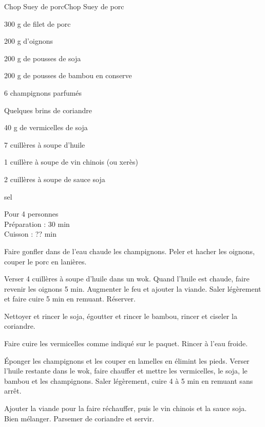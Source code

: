 \begin{recette}{Chop Suey de porc}{Chop Suey de porc}

\begin{ingredients}
300 g de filet de porc\par
200 g d'oignons\par
200 g de pousses de soja\par
200 g de pousses de bambou en conserve\par
6 champignons parfumés\par
Quelques brins de coriandre\par
40 g de vermicelles de soja\par
7 cuillères à soupe d'huile\par
1 cuillère à soupe de vin chinois (ou xerès)\par
2 cuillères à soupe de sauce soja\par
sel\par
\end{ingredients}

\begin{infos}
Pour 4 personnes\\
Préparation : 30 min\\
Cuisson : ?? min\\
\end{infos}

\begin{etapes}
\item Faire gonfler dans de l'eau chaude les champignons. Peler et hacher les oignons, couper le porc en lanières.
\item Verser 4 cuillères à soupe d'huile dans un wok. Quand l'huile est chaude, faire revenir les oignons 5 min. Augmenter le feu et ajouter la viande. Saler légèrement et faire cuire 5 min en remuant. Réserver.
\item Nettoyer et rincer le soja, égoutter et rincer le bambou, rincer et ciseler la coriandre.
\item Faire cuire les vermicelles comme indiqué sur le paquet. Rincer à l'eau froide.
\item Éponger les champignons et les couper en lamelles en élimint les pieds. Verser l'huile restante dans le wok, faire chauffer et mettre les vermicelles, le soja, le bambou et les champignons. Saler légèrement, cuire 4 à 5 min en remuant sans arrêt.
\item Ajouter la viande pour la faire réchauffer, puis le vin chinois et la sauce soja. Bien mélanger. Parsemer de coriandre et servir.
\end{etapes}

\end{recette}